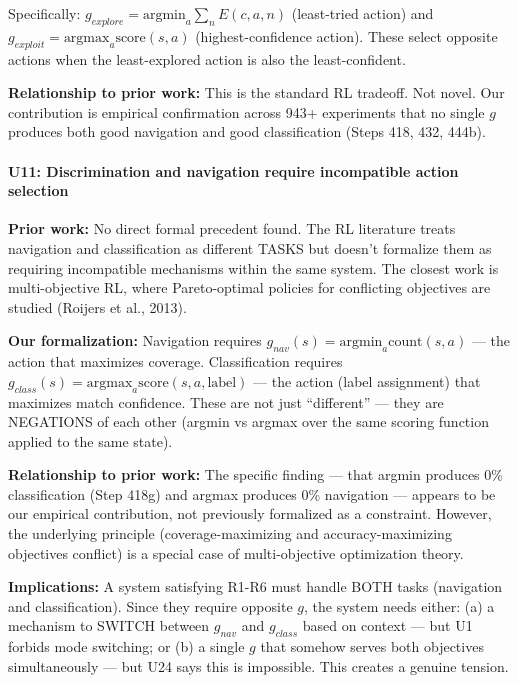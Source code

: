 \documentclass[
  11pt,
]{article}
\begin{document}
Specifically: \(g_{explore} = \text{argmin}_a \sum_n E(c, a, n)\)
(least-tried action) and
\(g_{exploit} = \text{argmax}_a \text{score}(s, a)\) (highest-confidence
action). These select opposite actions when the least-explored action is
also the least-confident.

\textbf{Relationship to prior work:} This is the standard RL tradeoff.
Not novel. Our contribution is empirical confirmation across 943+
experiments that no single \(g\) produces both good navigation and good
classification (Steps 418, 432, 444b).

\paragraph{U11: Discrimination and navigation require incompatible
action
selection}\label{u11-discrimination-and-navigation-require-incompatible-action-selection}

\textbf{Prior work:} No direct formal precedent found. The RL literature
treats navigation and classification as different TASKS but doesn't
formalize them as requiring incompatible mechanisms within the same
system. The closest work is multi-objective RL, where Pareto-optimal
policies for conflicting objectives are studied (Roijers et al., 2013).

\textbf{Our formalization:} Navigation requires
\(g_{nav}(s) = \text{argmin}_a \text{count}(s, a)\) --- the action that
maximizes coverage. Classification requires
\(g_{class}(s) = \text{argmax}_a \text{score}(s, a, \text{label})\) ---
the action (label assignment) that maximizes match confidence. These are
not just ``different'' --- they are NEGATIONS of each other (argmin vs
argmax over the same scoring function applied to the same state).

\textbf{Relationship to prior work:} The specific finding --- that
argmin produces 0\% classification (Step 418g) and argmax produces 0\%
navigation --- appears to be our empirical contribution, not previously
formalized as a constraint. However, the underlying principle
(coverage-maximizing and accuracy-maximizing objectives conflict) is a
special case of multi-objective optimization theory.

\textbf{Implications:} A system satisfying R1-R6 must handle BOTH tasks
(navigation and classification). Since they require opposite \(g\), the
system needs either: (a) a mechanism to SWITCH between \(g_{nav}\) and
\(g_{class}\) based on context --- but U1 forbids mode switching; or (b)
a single \(g\) that somehow serves both objectives simultaneously ---
but U24 says this is impossible. This creates a genuine tension.
\end{document}
